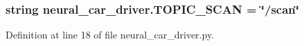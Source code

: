 \subsubsection[{\texorpdfstring{T\+O\+P\+I\+C\+\_\+\+S\+C\+AN}{TOPIC_SCAN}}]{\setlength{\rightskip}{0pt plus 5cm}string neural\+\_\+car\+\_\+driver.\+T\+O\+P\+I\+C\+\_\+\+S\+C\+AN = \char`\"{}/scan\char`\"{}}\hypertarget{namespaceneural__car__driver_aa0a0413ce25fecb4d35f07c7fea06a8c}{}\label{namespaceneural__car__driver_aa0a0413ce25fecb4d35f07c7fea06a8c}


Definition at line 18 of file neural\+\_\+car\+\_\+driver.\+py.

